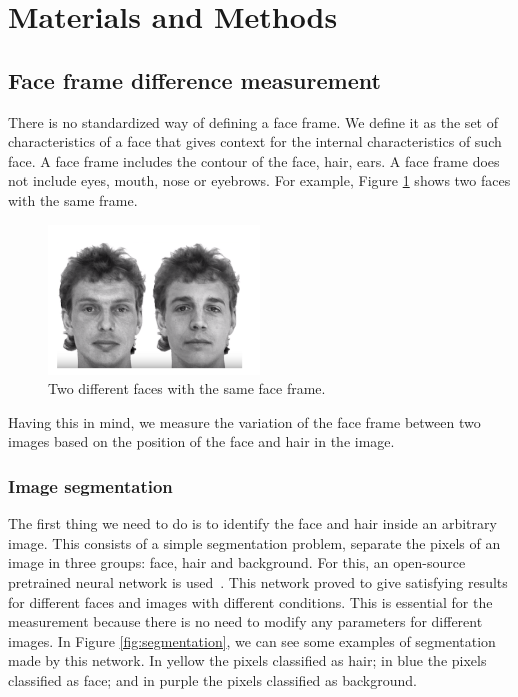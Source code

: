 \documentclass[review]{elsarticle}
\begin{document}
\section{Materials and Methods}\label{section:materials_and_methods}
\subsection{Face frame difference measurement}\label{subsection:face_frame_difference_measurement}

There is no standardized way of defining a face frame. We define it as the set of characteristics of a face that gives context for the internal characteristics of such face. A face frame includes the contour of the face, hair, ears. A face frame does not include eyes, mouth, nose or eyebrows. For example, Figure \ref{fig:faceframe} shows two faces with the same frame.

\begin{figure}[H]
  \includegraphics[width=0.5\textwidth, center]{Images/face_frame.png}
  \caption{Two different faces with the same face frame.}
  \label{fig:faceframe}
\end{figure}

Having this in mind, we measure the variation of the face frame between two images based on the position of the face and hair in the image.

\subsubsection{Image segmentation}
The first thing we need to do is to identify the face and hair inside an arbitrary image. This consists of a simple segmentation problem, separate the pixels of an image in three groups: face, hair and background. For this, an open-source pretrained neural network is used~\citep{segmentationgithub}. This network proved to give satisfying results for different faces and images with different conditions. This is essential for the measurement because there is no need to modify any parameters for different images. In Figure \ref{fig:segmentation}, we can see some examples of segmentation made by this network. In yellow the pixels classified as hair; in blue the pixels classified as face; and in purple the pixels classified as background.
\end{document}

